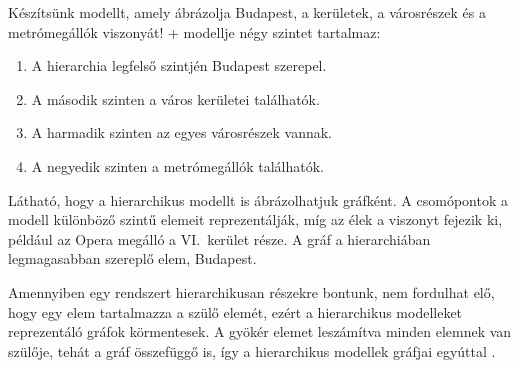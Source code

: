 
Készítsünk modellt, amely ábrázolja Budapest, a kerületek, a városrészek és a metrómegállók viszonyát! \Az+ modellje négy szintet tartalmaz:

\begin{enumerate}
	\item A hierarchia legfelső szintjén Budapest szerepel.
	\item A második szinten a város kerületei találhatók.
	\item A harmadik szinten az egyes városrészek vannak.
	\item A negyedik szinten a metrómegállók találhatók.
\end{enumerate}


Látható, hogy a hierarchikus modellt is ábrázolhatjuk gráfként. A csomópontok a modell különböző szintű elemeit reprezentálják, míg az élek a  viszonyt fejezik ki, például az Opera megálló a VI.~kerület része. A gráf  a hierarchiában legmagasabban szereplő elem, Budapest.

Amennyiben egy rendszert hierarchikusan részekre bontunk, nem fordulhat elő, hogy egy elem tartalmazza a szülő elemét, ezért a hierarchikus modelleket reprezentáló gráfok körmentesek. A gyökér elemet leszámítva minden elemnek van szülője, tehát a gráf összefüggő is, így a hierarchikus modellek gráfjai egyúttal .

